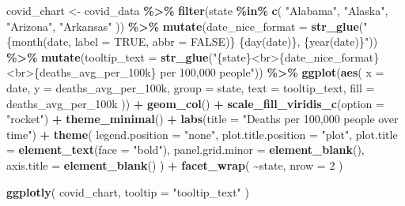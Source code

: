\documentclass[
]{book}
\newenvironment{Shaded}{\begin{snugshade}}{\end{snugshade}}
\newcommand{\AttributeTok}[1]{\textcolor[rgb]{0.13,0.29,0.53}{#1}}
\newcommand{\DecValTok}[1]{\textcolor[rgb]{0.00,0.00,0.81}{#1}}
\newcommand{\FunctionTok}[1]{\textcolor[rgb]{0.13,0.29,0.53}{\textbf{#1}}}
\newcommand{\NormalTok}[1]{#1}
\newcommand{\OtherTok}[1]{\textcolor[rgb]{0.56,0.35,0.01}{#1}}
\newcommand{\SpecialCharTok}[1]{\textcolor[rgb]{0.81,0.36,0.00}{\textbf{#1}}}
\newcommand{\StringTok}[1]{\textcolor[rgb]{0.31,0.60,0.02}{#1}}
\begin{document}
\begin{Shaded}
\begin{Highlighting}[]
\NormalTok{covid\_chart }\OtherTok{\textless{}{-}}\NormalTok{ covid\_data }\SpecialCharTok{\%\textgreater{}\%}
  \FunctionTok{filter}\NormalTok{(state }\SpecialCharTok{\%in\%} \FunctionTok{c}\NormalTok{(}
    \StringTok{"Alabama"}\NormalTok{,}
    \StringTok{"Alaska"}\NormalTok{,}
    \StringTok{"Arizona"}\NormalTok{,}
    \StringTok{"Arkansas"}
\NormalTok{  )) }\SpecialCharTok{\%\textgreater{}\%}
  \FunctionTok{mutate}\NormalTok{(}\AttributeTok{date\_nice\_format =} \FunctionTok{str\_glue}\NormalTok{(}\StringTok{"\{month(date, label = TRUE, abbr = FALSE)\} \{day(date)\}, \{year(date)\}"}\NormalTok{)) }\SpecialCharTok{\%\textgreater{}\%}
  \FunctionTok{mutate}\NormalTok{(}\AttributeTok{tooltip\_text =} \FunctionTok{str\_glue}\NormalTok{(}\StringTok{"\{state\}\textless{}br\textgreater{}\{date\_nice\_format\}\textless{}br\textgreater{}\{deaths\_avg\_per\_100k\} per 100,000 people"}\NormalTok{)) }\SpecialCharTok{\%\textgreater{}\%}
  \FunctionTok{ggplot}\NormalTok{(}\FunctionTok{aes}\NormalTok{(}
    \AttributeTok{x =}\NormalTok{ date,}
    \AttributeTok{y =}\NormalTok{ deaths\_avg\_per\_100k,}
    \AttributeTok{group =}\NormalTok{ state,}
    \AttributeTok{text =}\NormalTok{ tooltip\_text,}
    \AttributeTok{fill =}\NormalTok{ deaths\_avg\_per\_100k}
\NormalTok{  )) }\SpecialCharTok{+}
  \FunctionTok{geom\_col}\NormalTok{() }\SpecialCharTok{+}
  \FunctionTok{scale\_fill\_viridis\_c}\NormalTok{(}\AttributeTok{option =} \StringTok{"rocket"}\NormalTok{) }\SpecialCharTok{+}
  \FunctionTok{theme\_minimal}\NormalTok{() }\SpecialCharTok{+}
  \FunctionTok{labs}\NormalTok{(}\AttributeTok{title =} \StringTok{"Deaths per 100,000 people over time"}\NormalTok{) }\SpecialCharTok{+}
  \FunctionTok{theme}\NormalTok{(}
    \AttributeTok{legend.position =} \StringTok{"none"}\NormalTok{,}
    \AttributeTok{plot.title.position =} \StringTok{"plot"}\NormalTok{,}
    \AttributeTok{plot.title =} \FunctionTok{element\_text}\NormalTok{(}\AttributeTok{face =} \StringTok{"bold"}\NormalTok{),}
    \AttributeTok{panel.grid.minor =} \FunctionTok{element\_blank}\NormalTok{(),}
    \AttributeTok{axis.title =} \FunctionTok{element\_blank}\NormalTok{()}
\NormalTok{  ) }\SpecialCharTok{+}
  \FunctionTok{facet\_wrap}\NormalTok{(}
    \SpecialCharTok{\textasciitilde{}}\NormalTok{state,}
    \AttributeTok{nrow =} \DecValTok{2}
\NormalTok{  )}


\FunctionTok{ggplotly}\NormalTok{(}
\NormalTok{  covid\_chart,}
  \AttributeTok{tooltip =} \StringTok{"tooltip\_text"}
\NormalTok{)}
\end{Highlighting}
\end{Shaded}
\end{document}
